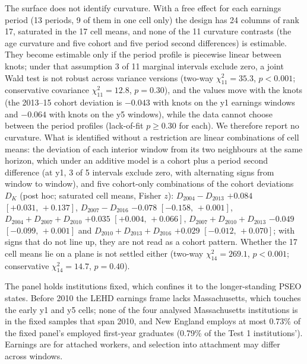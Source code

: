 \documentclass[11pt]{article}
\newcommand{\ci}[2]{$[#1,\allowbreak\,#2]$}
\begin{document}
The surface does not identify curvature. With a free effect for each earnings period (13 periods, 9 of them in one
cell only) the design has 24 columns of rank 17, saturated in the 17 cell means, and none of the 11 curvature
contrasts (the age curvature and five cohort and five period second differences) is estimable. They become
estimable only if the period profile is piecewise linear between knots; under that assumption 3 of 11 marginal
intervals exclude zero, a joint Wald test is not robust across variance versions (two-way $\chi^2_{11}=35.3$,
$p<0.001$; conservative covariance $\chi^2_{11}=12.8$, $p=0.30$), and the values move with the knots (the 2013--15
cohort deviation is $-0.043$ with knots on the y1 earnings windows and $-0.064$ with knots on the y5 windows), while
the data cannot choose between the period profiles (lack-of-fit $p\ge0.30$ for each). We therefore report no
curvature. What is identified without a restriction are linear combinations of cell means: the deviation of each
interior window from its two neighbours at the same horizon, which under an additive model is a cohort plus a period
second difference (at y1, 3 of 5 intervals exclude zero, with alternating signs from window to window), and five
cohort-only combinations of the cohort deviations $D_K$ (post hoc; saturated cell means, Fisher $z$): $D_{2004}-D_{2013}$
$+0.084$ \ci{+0.031}{+0.137}, $D_{2007}-D_{2016}$ $-0.078$ \ci{-0.158}{+0.001}, $D_{2004}+D_{2007}+D_{2010}$ $+0.035$
\ci{+0.004}{+0.066}, $D_{2007}+D_{2010}+D_{2013}$ $-0.049$ \ci{-0.099}{+0.001} and $D_{2010}+D_{2013}+D_{2016}$ $+0.029$
\ci{-0.012}{+0.070}; with signs that do not line up, they are not read as a cohort pattern. Whether the 17 cell means lie on a plane is not settled either (two-way
$\chi^2_{14}=269.1$, $p<0.001$; conservative $\chi^2_{14}=14.7$, $p=0.40$).

The panel holds institutions fixed, which confines it to the longer-standing PSEO states. Before 2010 the LEHD
earnings frame lacks Massachusetts, which touches the early y1 and y5 cells; none of the four analysed
Massachusetts institutions is in the fixed samples that span 2010, and New England employs at most 0.73\% of the
fixed panel's employed first-year graduates (0.79\% of the Test 1 institutions'). Earnings are for attached workers, and selection into attachment may differ
across windows.
\end{document}
